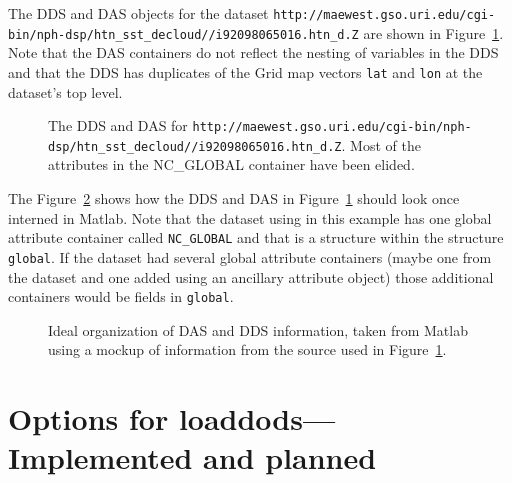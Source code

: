 \documentclass{article}
\newcommand{\maewesturl}{http://maewest.gso.uri.edu/\-cgi-bin/\-nph-dsp/\-htn\_sst\_decloud/\-1992/\-i92098065016.htn\_d.Z\xspace}
\begin{document}
The DDS and DAS objects for the dataset \texttt{\maewesturl} are shown in
Figure~\ref{fig:dds-das}. Note that the DAS containers do not reflect the
nesting of variables in the DDS and that the DDS has duplicates of the Grid
map vectors \texttt{lat} and \texttt{lon} at the dataset's top level.

\begin{figure}[!]
\begin{scriptsize}
\subfigure[DAS]{}
\subfigure[DDS]{}
\end{scriptsize}
\caption{The DDS and DAS for \texttt{\maewesturl}.
    Most of the attributes in the NC\_GLOBAL container have been elided.}
\label{fig:dds-das}
\end{figure}

The Figure~\ref{fig:ideal-organization} shows how the DDS and DAS in
Figure~\ref{fig:dds-das} should look once interned in Matlab. Note that the
dataset using in this example has one global attribute container called
\texttt{NC\_GLOBAL} and that is a structure within the structure
\texttt{global}. If the dataset had several global attribute containers
(maybe one from the dataset and one added using an ancillary attribute
object) those additional containers would be fields in \texttt{global}.

\begin{figure}
\begin{scriptsize}
\subfigure[]{}
\subfigure[]{}
\end{scriptsize}
\caption{Ideal organization of DAS and DDS information, taken from Matlab
    using a mockup of information from the source used in Figure~\ref{fig:dds-das}.}
\label{fig:ideal-organization}
\end{figure}

\section{Options for loaddods---Implemented and planned}
\label{app:options}
\end{document}
